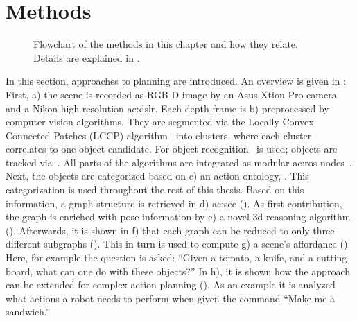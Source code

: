 \section{Methods}
\label{sec:action_methods}

\begin{figure}[]
  \centering
  
  \caption{Flowchart of the methods in this chapter and how they relate. Details are explained in .}
  \label{fig:actions_methods_flowchart}
\end{figure}

In this section, approaches to planning are introduced.
An overview is given in : First, a) the scene is recorded as RGB-D image by an Asus Xtion Pro camera and a Nikon high resolution \gls{ac:dslr}.
Each depth frame is b) preprocessed by computer vision algorithms.
They are segmented via the Locally Convex Connected Patches (LCCP) algorithm~\cite{stein2014object} into clusters, where each cluster correlates to one object candidate.
For object recognition~\cite{schoeler2014fast} is used; objects are tracked via~\cite{paponkulviciusaksoy2013}. 
All parts of the algorithms are integrated as modular \gls{ac:ros} nodes~\cite{quigleyconleygerkey2009}.
Next, the objects are categorized based on c) an action ontology, .
This categorization is used throughout the rest of this thesis.
Based on this information, a graph structure is retrieved in d) \acrlong{ac:sec} ().
As first contribution, the graph is enriched with pose information by e) a novel 3d reasoning algorithm ().
Afterwards, it is shown in f) that each graph can be reduced to only three different subgraphs ().
This in turn is used to compute g) a scene's affordance ().
Here, for example the question is asked: ``Given a tomato, a knife, and a cutting board, what can one do with these objects?''
In h), it is shown how the approach can be extended for complex action planning ().
As an example it is analyzed what actions a robot needs to perform when given the command ``Make me a sandwich.''
